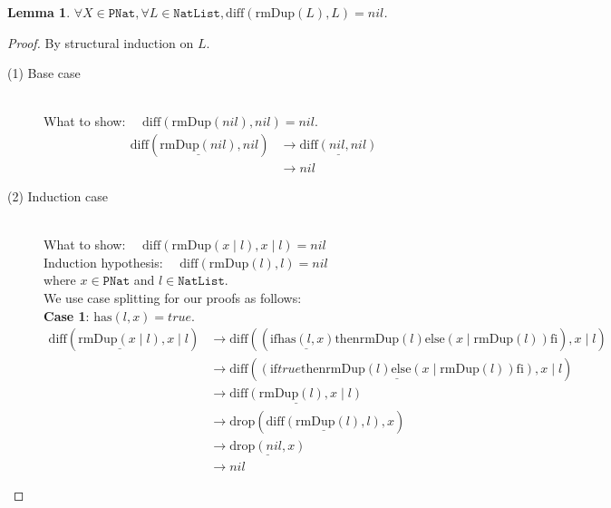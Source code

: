 \documentclass[12pt, a4paper]{article}
\newtheorem{lemma}[theorem]{Lemma}
\newcommand{\rel}[1]{\mathrel{#1}}
\newcommand{\rmx}[1]{\mathrm{#1}}
\newcommand{\larrow}{\longrightarrow}
\newcommand{\under}{\underline}
\begin{document}
\begin{lemma}
\label{lm2}
$\forall X \in \mathtt{PNat}, \forall L \in \mathtt{NatList}, \rmx{diff}(\rmx{rmDup}(L), L) = nil$.
\end{lemma}
\begin{proof}
By structural induction on $L$.
\begin{description}
\item[(1) Base case]~\\
\noindent
What to show: $\quad \rmx{diff}(\rmx{rmDup}(nil), nil) = nil$.
\begin{align*}
\rmx{diff}(\under{\rmx{rmDup}(nil)}, nil)
	&\larrow \under{\rmx{diff}(nil, nil)} \tag{by rmDup1} \\
	&\larrow nil \tag{by diff1}	
\end{align*}
\item[(2) Induction case]~\\
What to show: $\quad \rmx{diff}(\rmx{rmDup}(x \mid l), x \mid l) = nil$\\
Induction hypothesis: $\quad \rmx{diff}(\rmx{rmDup}(l), l) = nil$  \\
where $x \in \mathtt{PNat}$ and $l \in \mathtt{NatList}$.\\
We use case splitting for our proofs as follows: \\
\textbf{Case 1}: $\rmx{has}(l, x) = true$.
\begin{align*}
\rmx{diff}(\under{\rmx{rmDup}(x \mid l)}, x \mid l)
	&\larrow \rmx{diff}((\rel{\rmx{if}} \under{\rmx{has}(l, x)} \rel{\rmx{then}} \rmx{rmDup}(l) \rel{\rmx{else}} (x \mid \rmx{rmDup}(l)) \rel{\rmx{fi}}), x \mid l) \tag{by rmDup2} \\
	&\larrow \rmx{diff}(\under{(\rel{\rmx{if}} true \rel{\rmx{then}} \rmx{rmDup}(l) \rel{\rmx{else}} (x \mid \rmx{rmDup}(l)) \rel{\rmx{fi}})}, x \mid l) \tag{by case splitting} \\
	&\larrow \under{\rmx{diff}(\rmx{rmDup}(l), x \mid l)} \tag{by if1} \\
	&\larrow \rmx{drop}(\under{\rmx{diff}(\rmx{rmDup}(l), l)}, x) \tag{by Problem 14} \\
	&\larrow \under{\rmx{drop}(nil, x)} \tag{by IH} \\
	&\larrow nil \tag{by drop1}
\end{align*}


\end{description}
\end{proof}
\end{document}
